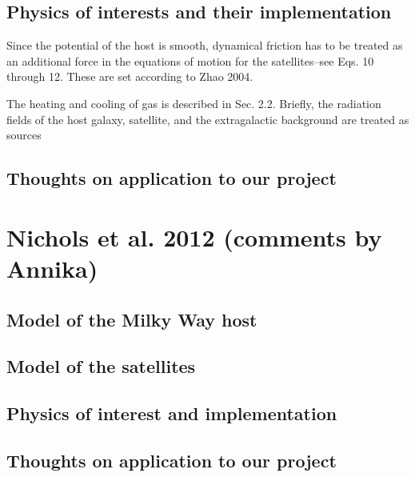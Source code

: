 \documentclass[11pt,longbibliography]{article}
\begin{document}
\subsection{Physics of interests and their implementation}
Since the potential of the host is smooth, dynamical friction has to be treated as an additional force in the equations of motion for the satellites--see Eqs. 10 through 12.  These are set according to Zhao 2004.  

The heating and cooling of gas is described in Sec. 2.2.  Briefly, the radiation fields of the host galaxy, satellite, and the extragalactic background are treated as sources

\subsection{Thoughts on application to our project}

\section{Nichols et al. 2012 (comments by Annika)}

\subsection{Model of the Milky Way host}

\subsection{Model of the satellites}

\subsection{Physics of interest and implementation}

\subsection{Thoughts on application to our project}






\end{document}
